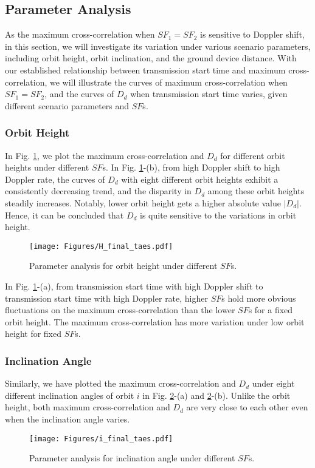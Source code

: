 \documentclass{IEEEtaes}
\theoremstyle{plain}
\begin{document}
\subsection{Parameter Analysis}\label{Parameter_analysis}
As the maximum cross-correlation when $SF_1 = SF_2$ is sensitive to Doppler shift, in this section, we will investigate its variation under various scenario parameters, including orbit height, orbit inclination, and the ground device distance. With our established relationship between transmission start time and maximum cross-correlation, we will illustrate the curves of maximum cross-correlation when $SF_1 = SF_2$, and the curves of $D_d$ when transmission start time varies, given different scenario parameters and $SF$s. 

\subsubsection{Orbit Height} 
In Fig. \ref{H_final}, we plot the maximum cross-correlation and $D_d$ for different orbit heights under different $SF$s. 
In Fig. \ref{H_final}-(b), from high Doppler shift to high Doppler rate, the curves of $D_d$ with eight different orbit heights exhibit a consistently decreasing trend, and the disparity in $D_d$ among these orbit heights steadily increases. Notably, lower orbit height gets a higher absolute value $|D_d|$. Hence, it can be concluded that $D_d$ is quite sensitive to the variations in orbit height.

\begin{figure}[ht]
  \centering
  \texttt{[image: Figures/H\_final\_taes.pdf]}
  \caption{Parameter analysis for orbit height under different $SF$s.}
  \label{H_final}
\end{figure}
In Fig. \ref{H_final}-(a), from transmission start time with high Doppler shift to transmission start time with high Doppler rate, higher $SF$s hold more obvious fluctuations on the maximum cross-correlation than the lower $SF$s for a fixed orbit height. The maximum cross-correlation has more variation under low orbit height for fixed $SF$s. 

\subsubsection{Inclination Angle}
Similarly, we have plotted the maximum cross-correlation and $D_d$ under eight different inclination angles of orbit $i$ in Fig. \ref{i_final}-(a) and \ref{i_final}-(b). 
Unlike the orbit height, both maximum cross-correlation and $D_d$ are very close to each other even when the inclination angle varies.  %
\begin{figure}[ht]
  \centering
  \centering
  \texttt{[image: Figures/i\_final\_taes.pdf]}
  \caption{Parameter analysis for inclination angle under different $SF$s.}
  \label{i_final}
\end{figure}
\end{document}
